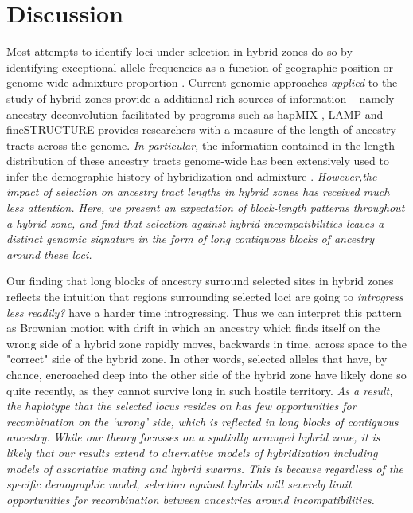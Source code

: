 \documentclass[11pt,letterpaper]{article}
\newcommand{\alisa}[1]{{\em \color{red} #1}}
\newcommand{\yb}[1]{{\em \color{magenta} #1}}
\begin{document}
\section*{Discussion}

Most attempts to identify loci under selection in hybrid zones do so by identifying exceptional allele frequencies as a function of geographic position or genome-wide admixture proportion \citep{Porter1997,Gompert2012}.  
Current genomic approaches \alisa{applied} to the study of hybrid zones provide a additional rich sources of information -- namely ancestry deconvolution facilitated by programs such as hapMIX \citep{Price2009}, LAMP \citep{Sankararaman2008} and fineSTRUCTURE \citep{Lawson2012} provides researchers with a measure of the length of ancestry tracts across the genome.  \alisa{In particular,} the information contained in the length distribution of these ancestry tracts genome-wide  has been extensively used to infer the demographic history of hybridization and admixture \citep[e.g. ][]{Hellenthal2014}.  \alisa{However,the impact of selection on ancestry tract lengths in hybrid zones has received much less attention. Here, we present an expectation of block-length patterns throughout a hybrid zone, and find that selection against hybrid incompatibilities leaves a distinct genomic signature in the form of long contiguous blocks of ancestry around these loci.} 


Our finding that long blocks of ancestry surround selected sites in hybrid zones reflects the intuition that regions surrounding selected loci are going to \alisa{introgress less readily?} have a harder time introgressing. 
Thus we can interpret this pattern as Brownian motion with drift in which an ancestry which finds itself on the wrong side of a hybrid zone rapidly moves, backwards in time, across space to the "correct" side of the hybrid zone.  In other words, selected alleles that have, by chance, encroached deep into the other side of the hybrid zone have likely done so quite recently, as they cannot survive long in such hostile territory.  \alisa{As a result, the haplotype that the selected locus resides on has few opportunities for recombination on the `wrong' side, which is reflected in long blocks of contiguous ancestry.}
\yb{While our theory focusses on a spatially arranged hybrid zone, it is likely that our results extend to alternative models of hybridization including models of assortative mating and hybrid swarms. This is because regardless of the specific demographic model, selection against hybrids will severely limit opportunities for recombination between ancestries around incompatibilities.}
\end{document}
